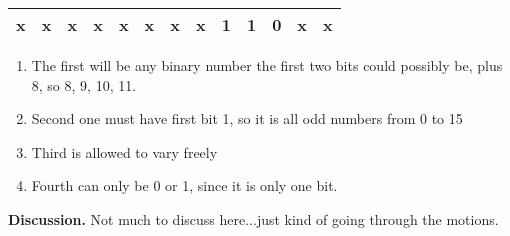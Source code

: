 \documentclass{article}
\begin{document}
\begin{enumerate}[A.]
\begin{center}
  \begin{tabular}{*{13}{|c} |}
    
    \hline
    x  & x & x & x & x & x & x & x  & 1  & 1  & 0 & x & x     \\ \hline
  \end{tabular}
\end{center}


\begin{enumerate}

\item The first will be any binary number the first two bits could possibly be, plus $8$, so
8, 9, 10, 11.

\item Second one must have first bit 1, so it is all odd numbers from 0 to 15

\item Third is allowed to vary freely

\item Fourth can only be 0 or 1, since it is only one bit. 

\end{enumerate}


\end{enumerate}

\noindent \textbf{Discussion.} Not much to discuss here...just kind of going through the motions.
\end{document}
